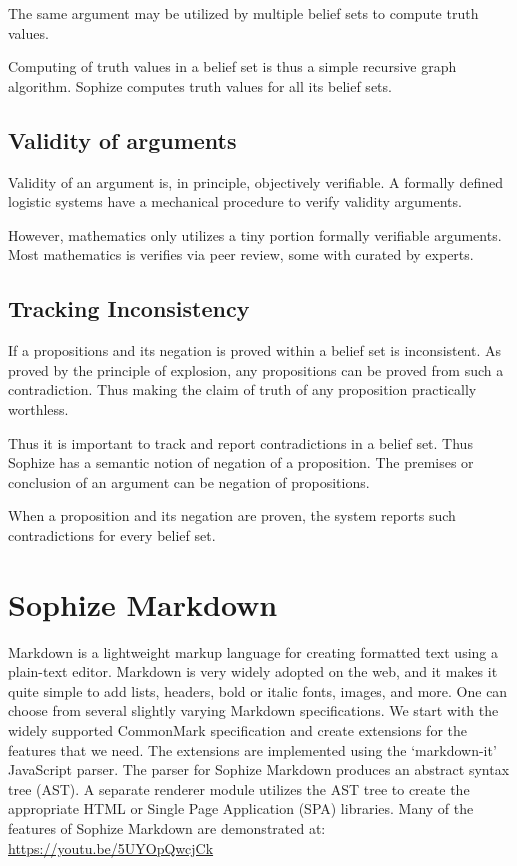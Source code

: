 \documentclass[a4paper]{article}
\begin{document}
The same argument may be utilized by multiple belief sets to compute truth values.

Computing of truth values in a belief set is thus a simple recursive graph algorithm. Sophize computes truth values for all its belief sets.

\subsection{Validity of arguments}
Validity of an argument is, in principle, objectively verifiable. A formally defined logistic systems have a mechanical procedure to verify validity arguments.

However, mathematics only utilizes a tiny portion formally verifiable arguments. Most mathematics is verifies via peer review, some with curated by experts.



\subsection{Tracking Inconsistency}
If a propositions and its negation is proved within a belief set is inconsistent. As proved by the principle of explosion, any propositions can be proved from such a contradiction. Thus making the claim of truth of any proposition practically worthless.

Thus it is important to track and report contradictions in a belief set. Thus Sophize has a semantic notion of negation of a proposition. The premises or conclusion of an argument can be negation of propositions.

When a proposition and its negation are proven, the system reports such contradictions for every belief set.


\section{Sophize Markdown}

Markdown is a lightweight markup language for creating formatted text using a plain-text editor. Markdown is very widely adopted on the web, and it makes it quite simple to add lists, headers, bold or italic fonts, images, and more. One can choose from several slightly varying Markdown specifications. We start with the widely supported CommonMark specification and create extensions for the features that we need. The extensions are implemented using the `markdown-it' \cite{markdown_it} JavaScript parser. The parser for Sophize Markdown produces an abstract syntax tree (AST). A separate renderer module utilizes the AST tree to create the appropriate HTML or Single Page Application (SPA) libraries. Many of the features of Sophize Markdown are demonstrated at: \url{https://youtu.be/5UYOpQwcjCk}
\end{document}

